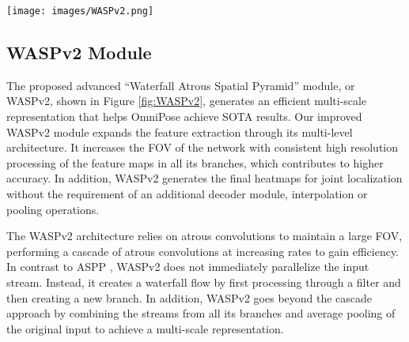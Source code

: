 \documentclass[10pt,twocolumn,letterpaper]{article}
\begin{document}
\begin{figure*}
\begin{center}
\texttt{[image: images/WASPv2.png]}
\end{center}
  \caption{The proposed WASPv2 advanced waterfall module. The inputs are 48 features maps from the modified HRNet backbone and low-level features from the initial layers of the framework.}
\label{fig:WASPv2}
\end{figure*}

\subsection{WASPv2 Module}


The proposed advanced ``Waterfall Atrous Spatial Pyramid'' module, or WASPv2, shown in Figure \ref{fig:WASPv2}, generates an efficient multi-scale representation that helps OmniPose achieve SOTA results. Our improved WASPv2 module expands the feature extraction through its multi-level architecture. It increases the FOV of the network with consistent high resolution processing of the feature maps in all its branches, which contributes to higher accuracy.
In addition, WASPv2 generates the final heatmaps for joint localization without the requirement of an additional decoder module, interpolation or pooling operations.





The WASPv2 architecture relies on atrous convolutions to maintain a large FOV, performing a cascade of atrous convolutions at increasing rates to gain efficiency. In contrast to ASPP \cite{DeepLabv3+}, WASPv2 does not immediately parallelize the input stream. Instead, it creates a waterfall flow by first processing through a filter and then creating a new branch. In addition, WASPv2 goes beyond the cascade approach by combining the streams from all its branches and average pooling of the original input to achieve a multi-scale representation.
\end{document}
